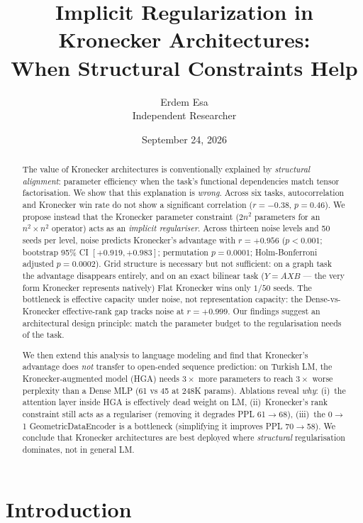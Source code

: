\documentclass[11pt,a4paper]{article}
\title{Implicit Regularization in Kronecker Architectures:\\
When Structural Constraints Help}
\author{Erdem Esa\\ \small Independent Researcher}
\date{September 24, 2026}
\begin{document}
\maketitle

\begin{abstract}
The value of Kronecker architectures is conventionally explained by
\emph{structural alignment}: parameter efficiency when the task's
functional dependencies match tensor factorisation. We show that this
explanation is \emph{wrong}. Across six tasks, autocorrelation and
Kronecker win rate do not show a significant correlation ($r = -0.38$, $p = 0.46$). We
propose instead that the Kronecker parameter constraint
($2n^2$ parameters for an $n^2 \times n^2$ operator) acts as an
\emph{implicit regulariser}. Across thirteen noise levels and 50 seeds
per level, noise predicts Kronecker's advantage with $r = +0.956$
($p < 0.001$; bootstrap 95\% CI $[+0.919, +0.983]$; permutation
$p = 0.0001$; Holm-Bonferroni adjusted $p = 0.0002$).
Grid structure is necessary but not sufficient: on a graph task the
advantage disappears entirely, and on an exact bilinear task
($Y = AXB$ --- the very form Kronecker represents natively) Flat
Kronecker wins only $1/50$ seeds. The bottleneck is effective capacity under noise, not
representation capacity: the Dense-vs-Kronecker effective-rank
gap tracks noise at $r = +0.999$. Our findings suggest an architectural design
principle: match the parameter budget to the regularisation needs
of the task.

We then extend this analysis to language modeling and find that
Kronecker's advantage does \emph{not} transfer to open-ended sequence
prediction: on Turkish LM, the Kronecker-augmented model (HGA) needs
$3\times$ more parameters to reach $3\times$ worse perplexity than a
Dense MLP (61 vs 45 at 248K params). Ablations reveal \emph{why}:
(i)~the attention layer inside HGA is effectively dead weight on LM,
(ii)~Kronecker's rank constraint still acts as a regulariser
(removing it degrades PPL 61$\to$68), (iii)~the 0$\to$1
GeometricDataEncoder is a bottleneck (simplifying it improves PPL
70$\to$58). We conclude that Kronecker architectures are best
deployed where \emph{structural} regularisation dominates, not in
general LM.
\end{abstract}


\section{Introduction}
\label{sec:intro}
\end{document}
